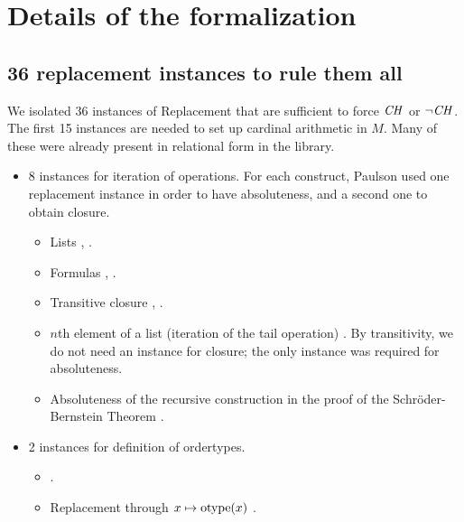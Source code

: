 \section{Details of the formalization}

\subsection{36 replacement instances to rule them all}
\label{sec:repl-instances}

We isolated 36 instances of Replacement that are sufficient to force
$\mathit{CH}$ or $\neg\mathit{CH}$. The first 15 instances are needed to set up
cardinal arithmetic in $M$. Many of these were already present in
relational form in the  library.

\begin{itemize}
\item 8 instances for iteration of operations. For each construct,
  Paulson used one replacement instance in order to have absoluteness,
  and a second one to obtain closure.
  \begin{itemize}
  \item
    Lists
    ,
    .
  \item
    Formulas
    ,
    .
  \item
    Transitive closure %
    ,
    .
  \item
    $n$th element of a list (iteration of the tail operation)
    . By transitivity,
    we do not need an instance for closure; the only instance was required
    for absoluteness.
  \item Absoluteness of the recursive construction in the proof of the
    Schröder-Bernstein Theorem .
  \end{itemize}
\item
  2 instances for definition of ordertypes.
  \begin{itemize}
  \item {}.
  \item Replacement through $x\mapsto \operatorname{otype}(x)$ .

\end{itemize}
\end{itemize}
